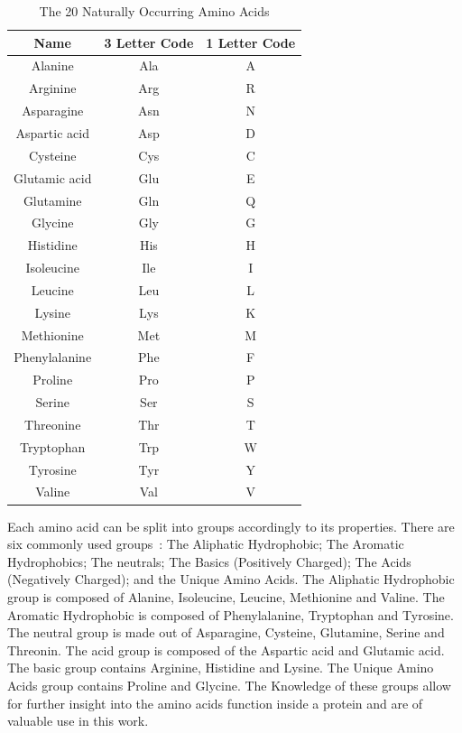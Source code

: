 \begin{table}[h]
    \centering
    \begin{tabular}{c|c|c} \hline \hline
        Name          & 3 Letter Code & 1 Letter Code \\ \hline \hline
        Alanine       & Ala  & A \\
        Arginine      & Arg  & R \\
        Asparagine    & Asn  & N \\
        Aspartic acid & Asp  & D \\
        Cysteine      & Cys  & C \\
        Glutamic acid & Glu  & E \\
        Glutamine     & Gln  & Q \\
        Glycine       & Gly  & G \\
        Histidine     & His  & H \\
        Isoleucine    & Ile  & I \\
        Leucine       & Leu  & L \\
        Lysine        & Lys  & K \\
        Methionine    & Met  & M \\
        Phenylalanine & Phe  & F \\
        Proline       & Pro  & P \\
        Serine        & Ser  & S \\
        Threonine     & Thr  & T \\
        Tryptophan    & Trp  & W \\
        Tyrosine      & Tyr  & Y \\
        Valine        & Val  & V \\ \hline \hline
    \end{tabular}
    \caption{The 20 Naturally Occurring Amino Acids}
    \label{tab:amino-acids}
\end{table}

Each amino acid can be split into groups accordingly to its properties.
There are six commonly used groups~\cite{garrett1999biochemistry}:
The Aliphatic Hydrophobic; The Aromatic Hydrophobics; The neutrals;
The Basics (Positively Charged); The Acids (Negatively Charged);
and the Unique Amino Acids. The Aliphatic Hydrophobic group is composed of
Alanine, Isoleucine, Leucine, Methionine and Valine. The Aromatic Hydrophobic
is composed of Phenylalanine, Tryptophan and Tyrosine. The neutral group is made
out of Asparagine, Cysteine, Glutamine, Serine and Threonin. The acid group is
composed of the Aspartic acid and Glutamic acid. The basic group contains Arginine,
Histidine and Lysine. The Unique Amino Acids group contains Proline and Glycine.
The Knowledge of these groups allow for further insight into the amino acids
function inside a protein and are of valuable use in this work.

